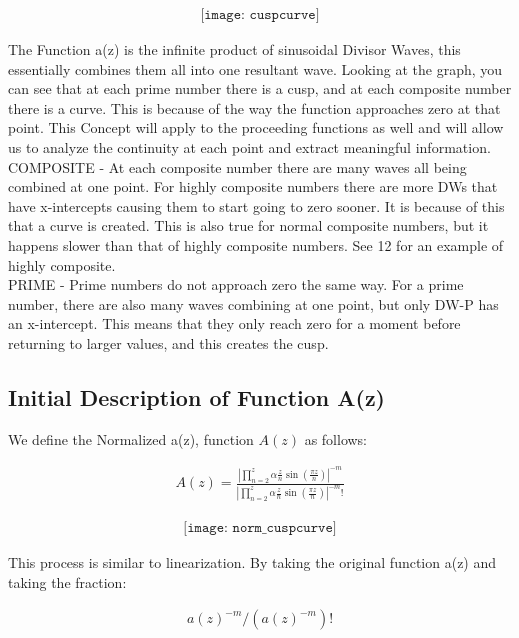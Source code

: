 \documentclass{article}
\begin{document}
\begin{align*}
\texttt{[image: cuspcurve]}
\end{align*}

The Function a(z) is the infinite product of sinusoidal Divisor Waves, this essentially combines them all into one resultant wave. Looking at the graph, you can see that at each prime number there is a cusp, and at each composite number there is a curve. This is because of the way the function approaches zero at that point. This Concept will apply to the proceeding functions as well and will allow us to analyze the continuity at each point and extract meaningful information. \\
\newline
COMPOSITE - At each composite number there are many waves all being combined at one point. For highly composite numbers there are more DWs that have x-intercepts causing them to start going to zero sooner. It is because of this that a curve is created. This is also true for normal composite numbers, but it happens slower than that of highly composite numbers. See 12 for an example of highly composite. \\
\newline
PRIME - Prime numbers do not approach zero the same way. For a prime number, there are also many waves combining at one point, but only DW-P has an x-intercept. This means that they only reach zero for a moment before returning to larger values, and this creates the cusp. \\

\subsection*{Initial Description of Function A(z)}
We define the Normalized a(z), function $A(z)$ as follows:
	
\begin{align*}
	A(z) = \frac{|\prod_{n=2}^z \alpha\frac{z}{n}\sin\left(\frac{\pi z}{n}\right)|^{-m}}{|\prod_{n=2}^z \alpha\frac{z}{n}\sin\left(\frac{\pi z}{n}\right)|^{-m}!}
\end{align*} 

\begin{align*}
\texttt{[image: norm\_cuspcurve]}
\end{align*}

This process is similar to linearization. By taking the original function a(z) and taking the fraction:

\begin{align*}
a(z)^{-m}/(a(z)^{-m})!
\end{align*} 
\end{document}
